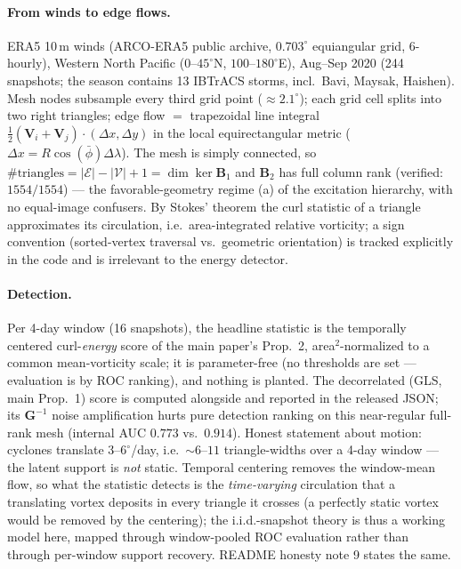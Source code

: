 \documentclass[11pt]{article}
\newcommand{\B}{\bm{B}}
\begin{document}
\paragraph{From winds to edge flows.} ERA5 10\,m winds (ARCO-ERA5 public
archive, $0.703^\circ$ equiangular grid, 6-hourly), Western North Pacific
($0$--$45^\circ$N, $100$--$180^\circ$E), Aug--Sep 2020 (244 snapshots; the
season contains 13 IBTrACS storms, incl.\ Bavi, Maysak, Haishen). Mesh nodes
subsample every third grid point ($\approx2.1^\circ$); each grid cell splits
into two right triangles; edge flow $=$ trapezoidal line integral
$\tfrac12(\bm V_i+\bm V_j)\!\cdot\!(\Delta x,\Delta y)$ in the local
equirectangular metric ($\Delta x = R\cos(\bar\phi)\Delta\lambda$). The mesh
is simply connected, so $\#\text{triangles}=|\mathcal E|-|\mathcal V|+1
=\dim\ker\B_1$ and $\B_2$ has full column rank (verified: $1554/1554$) --- the
favorable-geometry regime (a) of the excitation hierarchy,
with no equal-image confusers.
By Stokes' theorem the curl statistic of a triangle approximates its
circulation, i.e.\ area-integrated relative vorticity; a sign convention
(sorted-vertex traversal vs.\ geometric orientation) is tracked explicitly in
the code and is irrelevant to the energy detector.

\paragraph{Detection.} Per 4-day window (16 snapshots), the headline
statistic is the temporally centered curl-\emph{energy} score of the main
paper's Prop.~2, area$^2$-normalized to a common mean-vorticity scale; it is
parameter-free (no thresholds are set --- evaluation is by ROC ranking), and
nothing is planted. The decorrelated (GLS, main Prop.~1) score is computed alongside and
reported in the released JSON; its $\bm G^{-1}$ noise amplification hurts
pure detection ranking on this near-regular full-rank mesh (internal AUC
$0.773$ vs.\ $0.914$). Honest statement about motion: cyclones translate
$3$--$6^\circ$/day, i.e.\ $\sim$$6$--$11$ triangle-widths over a 4-day
window --- the latent support is \emph{not} static. Temporal centering
removes the window-mean flow, so what the statistic detects is the
\emph{time-varying} circulation that a translating vortex deposits in every
triangle it crosses (a perfectly static vortex would be removed by the
centering); the i.i.d.-snapshot theory is thus a working model here, mapped
through window-pooled ROC evaluation rather than through per-window support
recovery. README honesty note 9 states the same.
\end{document}
